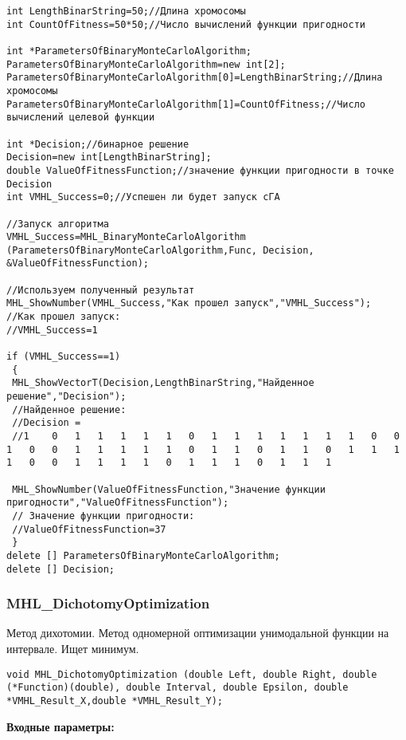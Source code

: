 \documentclass[a4paper,12pt]{article}
\begin{document}
\begin{lstlisting}[label=code_use_MHL_BinaryMonteCarloAlgorithm,caption=Пример использования]
int LengthBinarString=50;//Длина хромосомы
int CountOfFitness=50*50;//Число вычислений функции пригодности

int *ParametersOfBinaryMonteCarloAlgorithm;
ParametersOfBinaryMonteCarloAlgorithm=new int[2];
ParametersOfBinaryMonteCarloAlgorithm[0]=LengthBinarString;//Длина хромосомы
ParametersOfBinaryMonteCarloAlgorithm[1]=CountOfFitness;//Число вычислений целевой функции

int *Decision;//бинарное решение
Decision=new int[LengthBinarString];
double ValueOfFitnessFunction;//значение функции пригодности в точке Decision
int VMHL_Success=0;//Успешен ли будет запуск cГА

//Запуск алгоритма
VMHL_Success=MHL_BinaryMonteCarloAlgorithm (ParametersOfBinaryMonteCarloAlgorithm,Func, Decision, &ValueOfFitnessFunction);

//Используем полученный результат
MHL_ShowNumber(VMHL_Success,"Как прошел запуск","VMHL_Success");
//Как прошел запуск:
//VMHL_Success=1

if (VMHL_Success==1)
 {
 MHL_ShowVectorT(Decision,LengthBinarString,"Найденное решение","Decision");
 //Найденное решение:
 //Decision =
 //1	0	1	1	1	1	1	0	1	1	1	1	1	1	1	0	0	1	0	0	1	1	1	1	1	0	1	1	0	1	1	0	1	1	1	1	0	0	1	1	1	1	0	1	1	1	0	1	1	1

 MHL_ShowNumber(ValueOfFitnessFunction,"Значение функции пригодности","ValueOfFitnessFunction");
 // Значение функции пригодности:
 //ValueOfFitnessFunction=37
 }
delete [] ParametersOfBinaryMonteCarloAlgorithm;
delete [] Decision;
\end{lstlisting}

\subsubsection{MHL\_DichotomyOptimization}\label{MHL_DichotomyOptimization}

Метод дихотомии. Метод одномерной оптимизации унимодальной функции на интервале. Ищет минимум.


\begin{lstlisting}[label=code_syntax_MHL_DichotomyOptimization,caption=Синтаксис]
void MHL_DichotomyOptimization (double Left, double Right, double (*Function)(double), double Interval, double Epsilon, double *VMHL_Result_X,double *VMHL_Result_Y);
\end{lstlisting}

\textbf{Входные параметры:}
\end{document}
